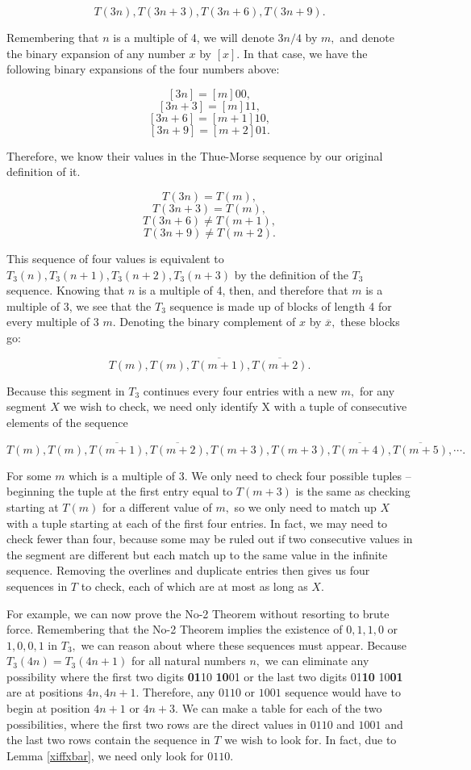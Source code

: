 \documentclass{article}
\begin{document}
$$T(3n), T(3n+3), T(3n+6), T(3n+9).$$

 Remembering that $n$ is a multiple of 4, we will denote $3n/4$ by $m,$ and denote the binary expansion of any number $x$ by $[x].$ In that case, we have the following binary expansions of the four numbers above:

$$[3n] = [m]00,$$
$$[3n + 3] = [m]11,$$
$$[3n + 6] = [m+1]10,$$
$$[3n + 9] = [m+2]01.$$

Therefore, we know their values in the Thue-Morse sequence by our original definition of it.

$$T(3n) = T(m),$$
$$T(3n + 3) = T(m),$$
$$T(3n + 6) \neq T(m+1),$$
$$T(3n + 9) \neq T(m+2).$$

This sequence of four values is equivalent to $T_3(n), T_3(n+1), T_3(n+2), T_3(n+3)$ by the definition of the $T_3$ sequence. Knowing that $n$ is a multiple of 4, then, and therefore that $m$ is a multiple of 3, we see that the $T_3$ sequence is made up of blocks of length 4 for every multiple of 3 $m.$ Denoting the binary complement of $x$ by $\overline{x},$ these blocks go:

$$T(m), T(m), \overline{T(m+1)}, \overline{T(m+2)}.$$

Because this segment in $T_3$ continues every four entries with a new $m,$ for any segment $X$ we wish to check, we need only identify X with a tuple of consecutive elements of the sequence

$$T(m), T(m), \overline{T(m+1)}, \overline{T(m+2)}, T(m+3), T(m+3), \overline{T(m+4)}, \overline{T(m+5)}, \cdots .$$

For some $m$ which is a multiple of 3. We only need to check four possible tuples -- beginning the tuple at the first entry equal to $T(m+3)$ is the same as checking starting at $T(m)$ for a different value of $m,$ so we only need to match up $X$ with a tuple starting at each of the first four entries. In fact, we may need to check fewer than four, because some may be ruled out if two consecutive values in the segment are different but each match up to the same value in the infinite sequence. Removing the overlines and duplicate entries then gives us four sequences in $T$ to check, each of which are at most as long as $X.$

For example, we can now prove the No-2 Theorem without resorting to brute force. Remembering that the No-2 Theorem implies the existence of $0, 1, 1, 0$ or $1, 0, 0, 1$ in $T_3,$ we can reason about where these sequences must appear. Because $T_3(4n) = T_3(4n + 1)$ for all natural numbers $n,$ we can eliminate any possibility where the first two digits \textbf{01}10 \textbf{10}01 or the last two digits 01\textbf{10} 10\textbf{01} are at positions $4n, 4n+1.$ Therefore, any $0110$ or $1001$ sequence would have to begin at position $4n+1$ or $4n+3.$ We can make a table for each of the two possibilities, where the first two rows are the direct values in $0110$ and $1001$ and the last two rows contain the sequence in $T$ we wish to look for. In fact, due to Lemma \ref{xiffxbar}, we need only look for $0110.$
\end{document}
